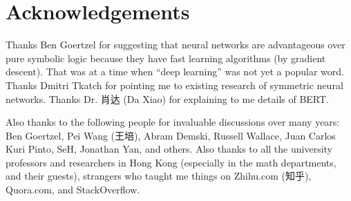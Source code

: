 \documentclass[orivec]{llncs}
\begin{document}
\section*{Acknowledgements}

Thanks Ben Goertzel for suggesting that neural networks are advantageous over pure symbolic logic because they have fast learning algorithms (by gradient descent).  That was at a time when ``deep learning'' was not yet a popular word.  Thanks Dmitri Tkatch for pointing me to existing research of symmetric neural networks.  Thanks Dr. 肖达 (Da Xiao) for explaining to me details of BERT. 

Also thanks to the following people for invaluable discussions over many years:  Ben Goertzel, Pei Wang (王培), Abram Demski, Russell Wallace, Juan Carlos Kuri Pinto, SeH, Jonathan Yan, and others.  Also thanks to all the university professors and researchers in Hong Kong (especially in the math departments, and their guests), strangers who taught me things on Zhihu.com (知乎), Quora.com, and StackOverflow.

\printbibliography
\end{document}
